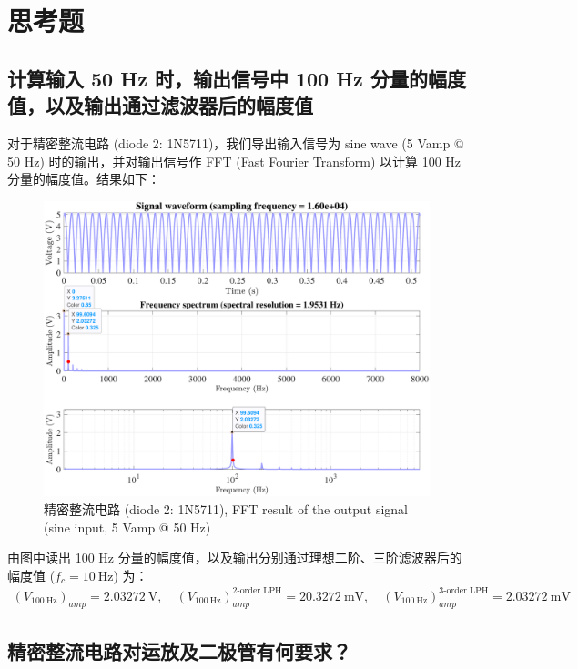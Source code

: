 \documentclass[UTF8]{article}
\begin{document}
\section{思考题}

\subsection{计算输入 50 Hz 时，输出信号中 100 Hz 分量的幅度值，以及输出通过滤波器后的幅度值}

对于精密整流电路 (diode 2: 1N5711)，我们导出输入信号为 sine wave (5 Vamp @ 50 Hz) 时的输出，并对输出信号作 FFT (Fast Fourier Transform) 以计算 100 Hz 分量的幅度值。结果如下：

\begin{figure}[H]\centering
    \includegraphics[width=\columnwidth]{LCE-05-精密整流/assets/1N5711/FFT.pdf}
    \caption{精密整流电路 (diode 2: 1N5711), FFT result of the output signal (sine input, 5 Vamp @ 50 Hz)}
\end{figure}

由图中读出 100 Hz 分量的幅度值，以及输出分别通过理想二阶、三阶滤波器后的幅度值 ($f_c = 10 \ \mathrm{Hz}$) 为：
\begin{gather}
(V_{100 \ \mathrm{Hz}})_{amp} = 2.03272 \ \mathrm{V},\quad 
(V_{100 \ \mathrm{Hz}})_{amp}^{\text{2-order\ LPH}} = 20.3272 \ \mathrm{mV},\quad
(V_{100 \ \mathrm{Hz}})_{amp}^{\text{3-order\ LPH}} = 2.03272 \ \mathrm{mV}
\end{gather}

\subsection{精密整流电路对运放及二极管有何要求？}
\end{document}
